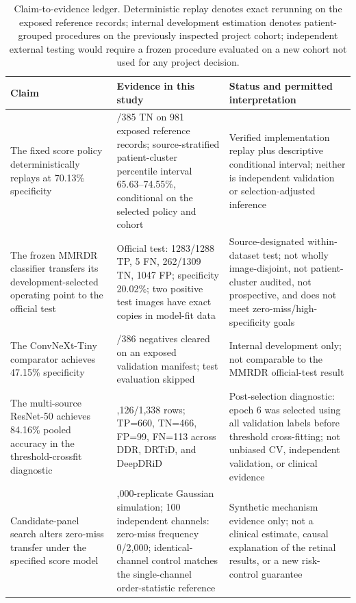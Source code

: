 \documentclass{ieeeaccess}
\begin{document}
\begin{table}[t]
\centering
\caption{Claim-to-evidence ledger. Deterministic replay denotes exact rerunning on the exposed reference records; internal development estimation denotes patient-grouped procedures on the previously inspected project cohort; independent external testing would require a frozen procedure evaluated on a new cohort not used for any project decision.}
\label{tab:claims}
\footnotesize
\setlength{\tabcolsep}{3pt}
\begin{tabularx}{\textwidth}{>{\raggedright\arraybackslash}p{}>{\raggedright\arraybackslash}p{}>{\raggedright\arraybackslash}X}
\toprule
Claim & Evidence in this study & \shortstack[l]{Status and permitted\\interpretation} \\
\midrule
The fixed score policy deterministically replays at 70.13\% specificity & 270/385 TN on 981 exposed reference records; source-stratified patient-cluster percentile interval 65.63--74.55\%, conditional on the selected policy and cohort & Verified implementation replay plus descriptive conditional interval; neither is independent validation or selection-adjusted inference \\
The frozen MMRDR classifier transfers its development-selected operating point to the official test & Official test: 1283/1288 TP, 5 FN, 262/1309 TN, 1047 FP; specificity 20.02\%; two positive test images have exact copies in model-fit data & Source-designated within-dataset test; not wholly image-disjoint, not patient-cluster audited, not prospective, and does not meet zero-miss/high-specificity goals \\
The ConvNeXt-Tiny comparator achieves 47.15\% specificity & 182/386 negatives cleared on an exposed validation manifest; test evaluation skipped & Internal development only; not comparable to the MMRDR official-test result \\
The multi-source ResNet-50 achieves 84.16\% pooled accuracy in the threshold-crossfit diagnostic & 1,126/1,338 rows; TP=660, TN=466, FP=99, FN=113 across DDR, DRTiD, and DeepDRiD & Post-selection diagnostic: epoch 6 was selected using all validation labels before threshold cross-fitting; not unbiased CV, independent validation, or clinical evidence \\
Candidate-panel search alters zero-miss transfer under the specified score model & 2,000-replicate Gaussian simulation; 100 independent channels: zero-miss frequency 0/2,000; identical-channel control matches the single-channel order-statistic reference & Synthetic mechanism evidence only; not a clinical estimate, causal explanation of the retinal results, or a new risk-control guarantee \\

\end{tabularx}
\end{table}
\end{document}
